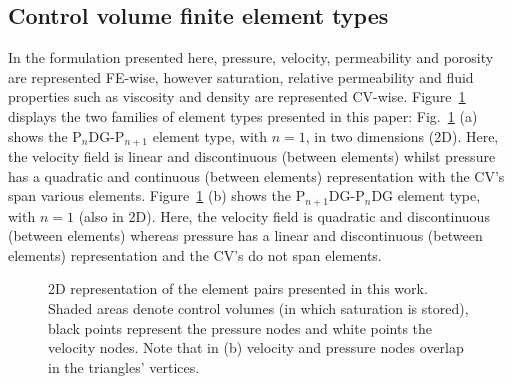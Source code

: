 \documentclass[times]{fldauth}
\begin{document}
\subsection{Control volume finite element types}
In the formulation presented here, pressure, velocity, permeability and porosity are represented FE-wise, however saturation, relative permeability and fluid properties such as viscosity and density are represented CV-wise. Figure~\ref{fem_cv_represent_a} displays the two families of element types presented in this paper: Fig.~\ref{fem_cv_represent_a} (a) shows the P$_{n}$DG-P$_{n+1}$ element type, with $n = 1$, in two dimensions (2D). Here, the velocity field is linear and discontinuous (between elements) whilst pressure has a quadratic and continuous (between elements) representation with the CV's span various elements. Figure~\ref{fem_cv_represent_a} (b) shows the P$_{n+1}$DG-P$_{n}$DG element type, with $n = 1$ (also in 2D). Here, the velocity field is quadratic and discontinuous (between elements) whereas pressure has a linear and discontinuous (between elements) representation and the CV's do not span elements.

\begin{figure}[h!]
\caption{2D representation of the element pairs presented in this work. Shaded areas denote control volumes (in which saturation is   stored), black points represent the pressure nodes and white points the velocity nodes. Note that in (b) velocity and pressure nodes overlap in the triangles' vertices.}
    \label{fem_cv_represent_a}
\end{figure} 
\end{document}

